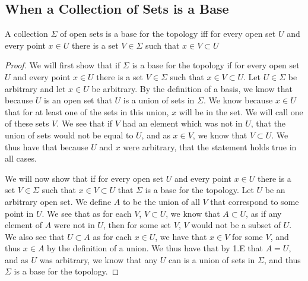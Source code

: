 \subsection{When a Collection of Sets is a Base}
\begin{majorEx}
  A collection $\Sigma$ of open sets is a base for the topology iff for
  every open set $U$ and every point $x\in U$  
there is a set $V \in
  \Sigma$ such that $x \in V \subset U$
\end{majorEx}
\begin{proof}
We will first show that if $\Sigma$ is a base for the  topology if for
every open set $U$ and every point $x \in U$ there is a set $V \in
\Sigma$ such that $x \in V \subset U$. Let $U\in \Sigma$ be arbitrary
and let $x\in U$ be arbitrary. By the definition of a basis, we know
that because $U$ is an open set that $U$ is a union of sets in $\Sigma
$. We know because $x \in U$ that for at least one of the sets in this
union, $x$ will be in the set. We will call one of these sets $V$.
We see that if $V$ had an
element which was not in $U$, that the union of sets would not be
equal to $U$, and as $x\in V$, we know that $V\subset U$. We thus have
that because $U$ and $x$ were arbitrary, that the statement holds true
in all cases.

We will now show that if for every open set $U$ and every point $x\in U$  
there is a set $V \in \Sigma$ such that $x \in V \subset U$ that
$\Sigma$ is a base for the topology. Let $U$ be an arbitrary open
set. We define $A$ to be the union of all $V$ that correspond to some
point in $U$. We see that as for each $V$, $V \subset U$, we know that
$A \subset U$, as if any element of $A$ were not in $U$, then for some
set $V$, $V$ would not be a subset of $U$. We also see that $U\subset
A$ as for each $x\in U$, we have that $x\in V$ for some $V$, and thus
$x\in A$ by the definition of a union. We thus have that by 1.E that
$A= U$, and as $U$ was arbitrary, we know that any $U$ can is a union
of sets in $\Sigma$, and thus $\Sigma$ is a base for the topology.
\end{proof}

